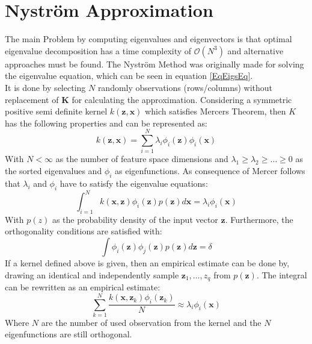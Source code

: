 \section{Nyström Approximation}\label{InSecNysMeth}
The main Problem by computing eigenvalues and eigenvectors is that optimal eigenvalue decomposition has a time complexity of $\mathcal{O}(N^3)$ and alternative approaches must be found.
The Nyström Method was originally made for solving the eigenvalue equation, which can be seen in equation \eqref{EqEigsEq}.\cite{Zhang.2008}\\
It is done by selecting $N$ randomly observations (rows/columns) without replacement of $\mathbf{K}$ for calculating the approximation.\cite{Williams.2000}
Considering a symmetric positive semi definite kernel $k(\mathbf{z},\mathbf{x})$ which satisfies Mercers Theorem, then $K$ has the following properties and can be represented as:\cite{Williams.2000}
\begin{equation}\label{EqKernelRep}
	k(\mathbf{z},\mathbf{x}) = \sum_{i=1}^{N}\lambda_i\phi_i(\mathbf{z})\phi_i(\mathbf{x}) 
\end{equation}
With $N < \infty$ as the number of feature space dimensions and $\lambda_1 \ge \lambda_2\ge\dots\ge0$ as the sorted eigenvalues and $\phi_i$ as eigenfunctions.
As consequence of Mercer follows that  $\lambda_i$ and $\phi_i$ have to satisfy the eigenvalue equations:
 \begin{equation}\label{EqEigsEq}
	\int_{i=1}^{N} k(\mathbf{x},\mathbf{z})\phi_i(\mathbf{z})p(\mathbf{z})d\mathbf{x} = \lambda_i\phi_i(\mathbf{x})
\end{equation}
With $p(z)$ as the probability density of the input vector $\mathbf{z}$.
Furthermore, the orthogonality conditions are satisfied with:\cite[p. 59]{Scholkopf.2001}
\begin{equation}\label{EqEigsOrt}
	\int \phi_i(\mathbf{z})\phi_j(\mathbf{z})p(\mathbf{z})d\mathbf{z} = \delta
\end{equation}
If a kernel defined above is given, then an empirical estimate can be done by, drawing an identical and independently sample ${\mathbf{z}_1,\dots,z_q}$ from $p(\mathbf{z})$.
The integral can be rewritten as an empirical estimate:\cite{Williams.2000}
\begin{equation}\label{EqEigsEmp}
	\sum_{k=1}^{N}\frac{k(\mathbf{x},\mathbf{z}_k)\phi_i(\mathbf{z}_k)}{N} \approx \lambda_i\phi_i(\mathbf{x})
\end{equation}
Where $N$ are the number of used observation from the kernel and the $N$ eigenfunctions are still orthogonal.
